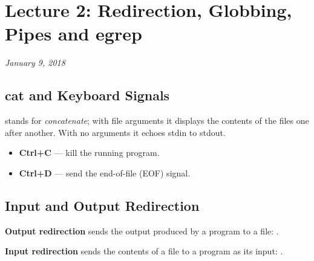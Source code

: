 \chapter{Lecture 2: Redirection, Globbing, Pipes and egrep}
\begin{center}
\textit{January 9, 2018}
\end{center}

\section{cat and Keyboard Signals}
 stands for \emph{concatenate}; with file arguments it displays the
contents of the files one after another. With no arguments it echoes stdin to
stdout.

\begin{itemize}
  \item \textbf{Ctrl+C} --- kill the running program.
  \item \textbf{Ctrl+D} --- send the end-of-file (EOF) signal.
\end{itemize}

\section{Input and Output Redirection}

\begin{definition}
\textbf{Output redirection} sends the output produced by a program to a file:
.

\textbf{Input redirection} sends the contents of a file to a program as its
input: .
\end{definition}

